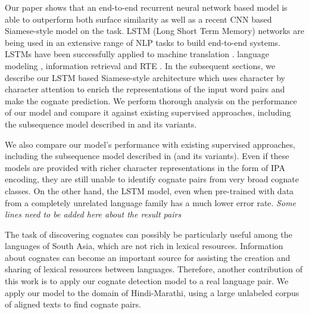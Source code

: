 \documentclass[11pt,letterpaper]{article}
\begin{document}

Our paper shows that an end-to-end recurrent neural network based model is able to outperform both surface similarity as well as a recent CNN based Siamese-style model \cite{rama2016siamese} on the task. LSTM (Long Short Term Memory) networks are being used in an extensive range of NLP tasks to build end-to-end systems. LSTMs have been successfully applied to machine translation \cite{bahdanau2014neural}. language modeling \cite{mikolov2010recurrent}, information retrieval \cite{sordoni2015hierarchical} and RTE \cite{snli:emnlp2015}. In the subsequent sections, we describe our LSTM based Siamese-style architecture which uses character by character attention to enrich the representations of the input word pairs and make the cognate prediction. We perform thorough analysis on the performance of our model and compare it against existing supervised approaches, including the subsequence model described in \cite{rama2015automatic} and its variants.


We also compare our model's performance with existing supervised approaches, including the subsequence model described in \cite{rama2015automatic} (and its variants). Even if these models are provided with richer character representations in the form of IPA encoding, they are still unable to identify cognate pairs from very broad cognate classes. On the other hand, the LSTM model, even when pre-trained with data from a completely unrelated language family has a much lower error rate.  \textit{Some lines need to be added here about the result pairs}

The task of discovering cognates can possibly be particularly useful among the languages of South Asia, which are not rich in lexical resources. Information about cognates can become an important source for assisting the creation and sharing of lexical resources between languages. Therefore, another contribution of this work is to apply our cognate detection model to a real language pair. We apply our model to the domain of Hindi-Marathi, using a large unlabeled corpus of aligned texts to find cognate pairs.
\end{document}
